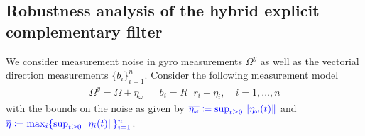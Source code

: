\documentclass{article}
\newcommand{\Omegay}{\Omega^y}
\newcommand{\textblue}[1]{\textcolor{blue}{#1}}
\newcommand{\noisegyro}{\eta_\omega}
\newcommand{\maxnoisegyro}{\overline{\eta_\omega}}
\newcommand{\noisevec}{\eta}
\newcommand{\maxnoisevec}{\overline{\eta}}
\begin{document}
\subsection{Robustness analysis of the hybrid explicit complementary filter}
We consider measurement noise in gyro measurements $\Omegay$ as well as the vectorial direction measurements $\{b_i\}_{i=1}^n$. Consider the following measurement model
\begin{align}\label{eq:hybridECF_ISS}
    \Omegay = \Omega + \noisegyro && b_i = R^\top r_i + \noisevec_i, \quad i=1,...,n
\end{align}
with the bounds on the noise as given by $\textblue{\maxnoisegyro\coloneqq \sup_{t\geq 0}\|\noisegyro(t)\|}$ and $\textblue{\maxnoisevec \coloneqq \max_{i}\{\sup_{t\geq 0}\|\noisevec_i(t)\|\}_{i=1}^n}$. 
\end{document}
